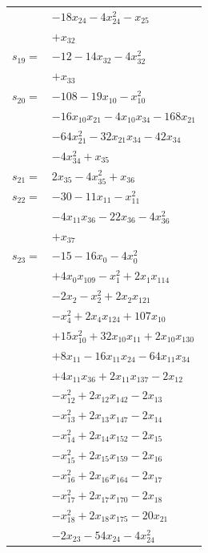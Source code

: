 \begin{longtable}{@{}r@{\;}l@{}}
 & \(\displaystyle -18x_{24} -4x_{24}^{2} -x_{25}\) \\
 & \(\displaystyle +x_{32}\) \\[3pt]
\(s_{19}=\) & \(\displaystyle -12 -14x_{32} -4x_{32}^{2}\) \\
 & \(\displaystyle +x_{33}\) \\[3pt]
\(s_{20}=\) & \(\displaystyle -108 -19x_{10} -x_{10}^{2}\) \\
 & \(\displaystyle -16x_{10}x_{21} -4x_{10}x_{34} -168x_{21}\) \\
 & \(\displaystyle -64x_{21}^{2} -32x_{21}x_{34} -42x_{34}\) \\
 & \(\displaystyle -4x_{34}^{2} +x_{35}\) \\[3pt]
\(s_{21}=\) & \(\displaystyle 2x_{35} -4x_{35}^{2} +x_{36}\) \\[3pt]
\(s_{22}=\) & \(\displaystyle -30 -11x_{11} -x_{11}^{2}\) \\
 & \(\displaystyle -4x_{11}x_{36} -22x_{36} -4x_{36}^{2}\) \\
 & \(\displaystyle +x_{37}\) \\[3pt]
\(s_{23}=\) & \(\displaystyle -15 -16x_{0} -4x_{0}^{2}\) \\
 & \(\displaystyle +4x_{0}x_{109} -x_{1}^{2} +2x_{1}x_{114}\) \\
 & \(\displaystyle -2x_{2} -x_{2}^{2} +2x_{2}x_{121}\) \\
 & \(\displaystyle -x_{4}^{2} +2x_{4}x_{124} +107x_{10}\) \\
 & \(\displaystyle +15x_{10}^{2} +32x_{10}x_{11} +2x_{10}x_{130}\) \\
 & \(\displaystyle +8x_{11} -16x_{11}x_{24} -64x_{11}x_{34}\) \\
 & \(\displaystyle +4x_{11}x_{36} +2x_{11}x_{137} -2x_{12}\) \\
 & \(\displaystyle -x_{12}^{2} +2x_{12}x_{142} -2x_{13}\) \\
 & \(\displaystyle -x_{13}^{2} +2x_{13}x_{147} -2x_{14}\) \\
 & \(\displaystyle -x_{14}^{2} +2x_{14}x_{152} -2x_{15}\) \\
 & \(\displaystyle -x_{15}^{2} +2x_{15}x_{159} -2x_{16}\) \\
 & \(\displaystyle -x_{16}^{2} +2x_{16}x_{164} -2x_{17}\) \\
 & \(\displaystyle -x_{17}^{2} +2x_{17}x_{170} -2x_{18}\) \\
 & \(\displaystyle -x_{18}^{2} +2x_{18}x_{175} -20x_{21}\) \\
 & \(\displaystyle -2x_{23} -54x_{24} -4x_{24}^{2}\) \\

\end{longtable}
